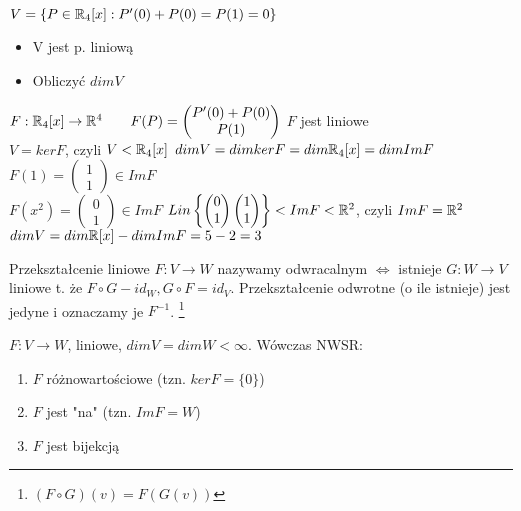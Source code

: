 \begin{prz}
    $ V = \{ P \in \mathbb{R}_4[x] : P'(0) + P(0) = P(1) = 0 \}$ 
    \begin{itemize}
        \item V jest p. liniową
        \item Obliczyć $dim V$
    \end{itemize}
    $ F : \mathbb{R}_4[x] \rightarrow \mathbb{R}^4 
        \qquad F(P) = \begin{pmatrix} P'(0) + P(0) \\ P(1) \end{pmatrix} $ \quad $F$ jest liniowe \\
    $V = ker F$, czyli $V < \mathbb{R}_4[x]$
    $dim V = dimker F = dim\mathbb{R}_4 [x] = dimImF$ 
    $F(1) = \begin{pmatrix} 1 \\ 1 \end{pmatrix} \in Im F$ \\
    $F(x^2) = \begin{pmatrix} 0 \\ 1 \end{pmatrix} \in Im F$
    $Lin \left\{ \begin{pmatrix} 0 \\ 1 \end{pmatrix} \begin{pmatrix} 1 \\ 1 \end{pmatrix} \right\} < Im F < \mathbb{R}^2 $, czyli
    $Im F = \mathbb{R}^2$ \\
    $dimV = dim\mathbb{R}[x] - dimImF = 5 - 2 = 3$
\end{prz}

\begin{df} 
    Przekształcenie liniowe $F: V \rightarrow W $ nazywamy odwracalnym $\Leftrightarrow$ istnieje $G: W \rightarrow V$ liniowe t. że $F \circ G - id_W, G \circ F = id_V.$ Przekształcenie odwrotne (o ile istnieje) jest jedyne i oznaczamy je $F^{-1}$. \footnote{$(F \circ G)(v) = F(G(v))$}
\end{df}

\begin{ft} $F: V \rightarrow W $, liniowe, $dim V = dimW < \infty$. Wówczas NWSR:
    \begin{enumerate}[{(}1{)}]
        \item $F$ różnowartościowe (tzn. $kerF = \{0\}$)
        \item $F$ jest "na" (tzn. $Im F = W$)
        \item $F$ jest bijekcją
    \end{enumerate}
\end{ft}

